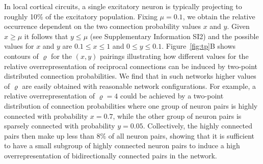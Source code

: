 In local cortical circuits, a single excitatory neuron is typically
projecting to roughly 10\% of the excitatory population.
%
Fixing $\mu = 0.1$, we obtain the relative occurrence dependent on the
two connection probability values $x$ and $y$.
%
Given $x \geq \mu$ it follows that $y \leq \mu$ (see Supplementary
Information SI2) and the possible values for $x$ and $y$ are $0.1 \leq x
\leq 1$ and $0 \leq y \leq 0.1$.
%
Figure~\ref{fig:tp}B shows contours of $\varrho$ for the $(x,y)$
pairings illustrating how different values for the relative
overrepresentation of reciprocal connections can be induced by
two-point distributed connection probabilities.
%
We find that in such networks higher values of $\varrho$ are easily
obtained with reasonable network configurations. %
%
For example, a relative overrepresentation of $\varrho=4$ could be
achieved by a two-point distribution of connection probabilities where
one group of neuron pairs is highly connected with probability
$x=0.7$, while the other group of neuron pairs is sparsely connected
with probability $y=0.05$.
%
Collectively, the highly connected pairs then make up less than $8\%$
of all neuron pairs, showing that it is sufficient to have a small
subgroup of highly connected neuron pairs to induce a high
overrepresentation of bidirectionally connected pairs in the network.






